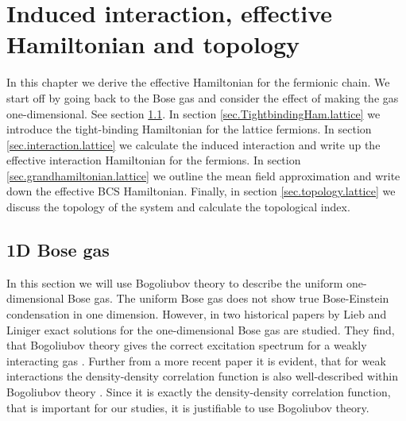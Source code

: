 \chapter{Induced interaction, effective Hamiltonian and topology} %

\label{Chapter7} 

In this chapter we derive the effective Hamiltonian for the fermionic chain. We start off by going back to the Bose gas and consider the effect of making the gas one-dimensional. See section \ref{sec.1DBosegas}. In section \ref{sec.TightbindingHam.lattice} we introduce the tight-binding Hamiltonian for the lattice fermions. In section \ref{sec.interaction.lattice} we calculate the induced interaction and write up the effective interaction Hamiltonian for the fermions. In section \ref{sec.grandhamiltonian.lattice} we outline the mean field approximation and write down the effective BCS Hamiltonian. Finally, in section \ref{sec.topology.lattice} we discuss the topology of the system and calculate the topological index.

\section{1D Bose gas} \label{sec.1DBosegas}
In this section we will use Bogoliubov theory to describe the uniform one-dimensional Bose gas. The uniform Bose gas does not show true Bose-Einstein condensation in one dimension. However, in two historical papers by Lieb and Liniger exact solutions for the one-dimensional Bose gas are studied. They find, that Bogoliubov theory gives the correct excitation spectrum for a weakly interacting gas \cite{LiebLiniger1, LiebLiniger2}. Further from a more recent paper it is evident, that for weak interactions the density-density correlation function is also well-described within Bogoliubov theory \cite{Calabrese}. Since it is exactly the density-density correlation function, that is important for our studies, it is justifiable to use Bogoliubov theory.

